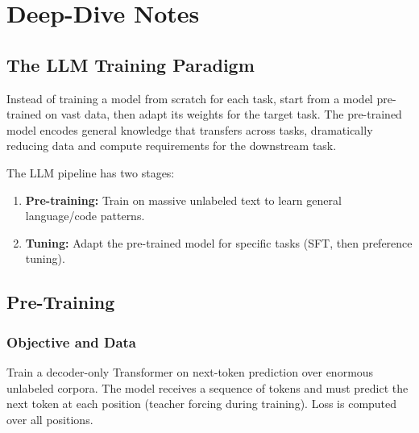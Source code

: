 \documentclass[11pt, a4paper]{article}
\begin{document}
\newpage
\section{Deep-Dive Notes}

\subsection{The LLM Training Paradigm}

\begin{defbox}
Instead of training a model from scratch for each task, start from a model pre-trained on vast data, then adapt its weights for the target task. The pre-trained model encodes general knowledge that transfers across tasks, dramatically reducing data and compute requirements for the downstream task.
\end{defbox}

The LLM pipeline has two stages:
\begin{enumerate}[leftmargin=2em]
  \item \textbf{Pre-training:} Train on massive unlabeled text to learn general language/code patterns.
  \item \textbf{Tuning:} Adapt the pre-trained model for specific tasks (SFT, then preference tuning).
\end{enumerate}

\subsection{Pre-Training}

\subsubsection{Objective and Data}

\begin{defbox}
Train a decoder-only Transformer on next-token prediction over enormous unlabeled corpora. The model receives a sequence of tokens and must predict the next token at each position (teacher forcing during training). Loss is computed over all positions.
\end{defbox}
\end{document}
